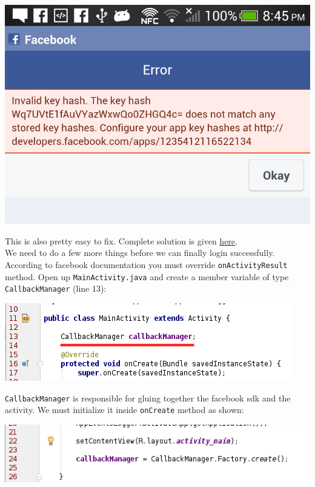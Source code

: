 \begin{center}
	\includegraphics[scale=0.20]{chapters/ch12/images/22}
\end{center}

This is also pretty easy to fix. Complete solution is given \href{http://stackoverflow.com/questions/23674131/android-facebook-integration-invalid-key-hash}{here}. \\

We need to do a few more things before we can finally login successfully. According to facebook documentation you must override \texttt{onActivityResult} method. Open up \texttt{MainActivity.java} and create a member variable of type \texttt{CallbackManager} (line 13):

\begin{center}
	\includegraphics[scale=\SourceCodeScale]{chapters/ch12/images/23}
\end{center}

\texttt{CallbackManager} is responsible for gluing together the facebook sdk and the activity. We must initialize it inside \texttt{onCreate} method as shown:

\begin{center}
	\includegraphics[scale=\SourceCodeScale]{chapters/ch12/images/24}
\end{center}

